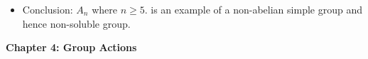 \documentclass[a4paper, 12pt]
{article}
\begin{document}
\begin{itemize}
\begin{itemize}
		\item Case 2: $\gamma_1 = (a_1 a_2 a_3)$ and $\gamma_2 = (a_4 a_5 a_6).$ Set $\sigma = (a_2 a_3 a_4)$ and calculate $\sigma \pi \sigma^{-1} \pi^{-1}.$  You should get $(a_1 a_2 a_4 a_3 a_5).$ Apply case 1.
		
		\item Case 3: $\gamma_1 = (a_1 a_2 a_3)$and $ \gamma_2 \gamma_3 \cdots\gamma_k $ are transpositions. Calculate $\pi^2.$ You should get $(a_1 a_3 a_2)$
		
		\item Case 4: $\gamma_1 \gamma_2 \cdots\gamma_k$ are all transpositions. Let $\gamma_1 = (a_1 a_2)$ and $\gamma_1 = (a_3 a_4).$ Set $\sigma = (a_2 a_3 a_4)$ Calculate $\sigma \pi \sigma^{-1} \pi^{-1}$ You should get $(a_1a_4)(a_2a_3)$
	\end{itemize}
	
	\item Conclusion: $A_n$ where $n \geq 5.$ is an example of a non-abelian simple group and hence non-soluble group.
	\end{itemize}
	
	\hfill
	
	\textbf{Chapter 4: Group Actions}
	
\end{document}
